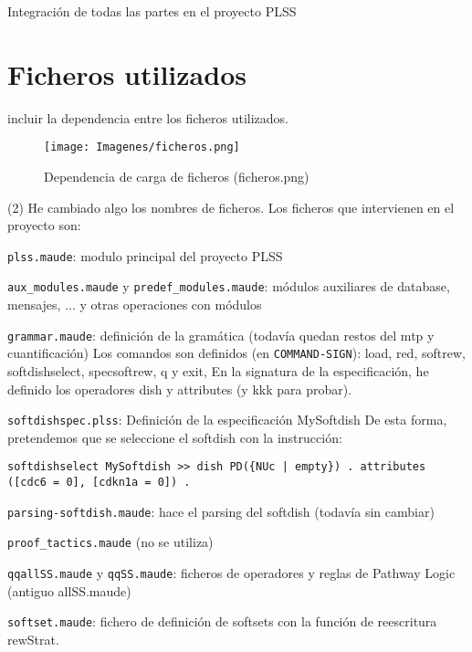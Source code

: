 Integración de todas las partes en el proyecto PLSS





\section{Ficheros utilizados}
incluir la dependencia entre los ficheros utilizados.
\medskip

\begin{figure}[h]
	\centering
	\texttt{[image: Imagenes/ficheros.png]}
	\caption{Dependencia de carga de ficheros (ficheros.png)}
	\label{fig:loads}
\end{figure}

(2) He cambiado algo los nombres de ficheros. Los ficheros que intervienen en el proyecto son:

\texttt{plss.maude}: modulo principal del proyecto PLSS


\texttt{aux\_modules.maude} y \texttt{predef\_modules.maude}: módulos auxiliares de database, mensajes, ... y otras operaciones con módulos

\texttt{grammar.maude}: definición de la gramática (todavía quedan restos del mtp y cuantificación)
Los comandos son definidos (en \texttt{COMMAND-SIGN}): load, red, softrew, softdishselect, specsoftrew, q y exit, 
En la signatura de la especificación, he definido los operadores dish y attributes (y kkk para probar).

\texttt{softdishspec.plss}: Definición de la especificación MySoftdish
De esta forma, pretendemos que se seleccione el softdish con la instrucción:

\begin{lstlisting}[language=Maude]
   softdishselect MySoftdish >> dish PD({NUc | empty}) . attributes ([cdc6 = 0], [cdkn1a = 0]) .
\end{lstlisting}



\texttt{parsing-softdish.maude}: hace el parsing del softdish (todavía sin cambiar)

\texttt{proof\_tactics.maude} (no se utiliza)


\texttt{qqallSS.maude} y \texttt{qqSS.maude}: ficheros de operadores y reglas de Pathway Logic (antiguo allSS.maude)

\texttt{softset.maude}: fichero de definición de softsets con la función de reescritura rewStrat.

